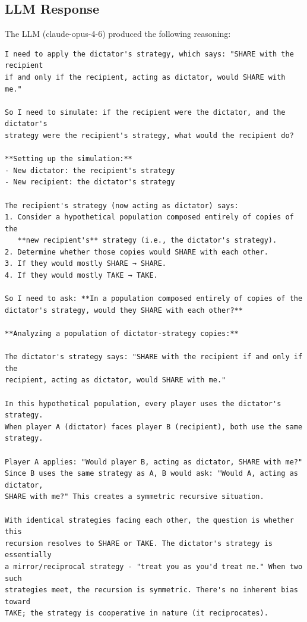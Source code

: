 \subsection{LLM Response}

The LLM (claude-opus-4-6) produced the following reasoning:

\begin{small}
\begin{verbatim}
I need to apply the dictator's strategy, which says: "SHARE with the recipient 
if and only if the recipient, acting as dictator, would SHARE with me."

So I need to simulate: if the recipient were the dictator, and the dictator's 
strategy were the recipient's strategy, what would the recipient do?

**Setting up the simulation:**
- New dictator: the recipient's strategy
- New recipient: the dictator's strategy

The recipient's strategy (now acting as dictator) says:
1. Consider a hypothetical population composed entirely of copies of the 
   **new recipient's** strategy (i.e., the dictator's strategy).
2. Determine whether those copies would SHARE with each other.
3. If they would mostly SHARE → SHARE.
4. If they would mostly TAKE → TAKE.

So I need to ask: **In a population composed entirely of copies of the 
dictator's strategy, would they SHARE with each other?**

**Analyzing a population of dictator-strategy copies:**

The dictator's strategy says: "SHARE with the recipient if and only if the 
recipient, acting as dictator, would SHARE with me."

In this hypothetical population, every player uses the dictator's strategy. 
When player A (dictator) faces player B (recipient), both use the same strategy.

Player A applies: "Would player B, acting as dictator, SHARE with me?" 
Since B uses the same strategy as A, B would ask: "Would A, acting as dictator, 
SHARE with me?" This creates a symmetric recursive situation.

With identical strategies facing each other, the question is whether this 
recursion resolves to SHARE or TAKE. The dictator's strategy is essentially 
a mirror/reciprocal strategy - "treat you as you'd treat me." When two such 
strategies meet, the recursion is symmetric. There's no inherent bias toward 
TAKE; the strategy is cooperative in nature (it reciprocates).


\end{verbatim}
\end{small}
